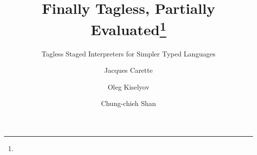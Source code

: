 \documentclass[oribibl,orivec]{llncs}
\begin{document}
\title{Finally Tagless, Partially Evaluated\thanks{\ourthanks}}
\subtitle{Tagless Staged Interpreters for Simpler Typed Languages}
\author{Jacques Carette \and Oleg Kiselyov \and Chung-chieh Shan}

\maketitle



\bibsep=0pt

\end{document}
